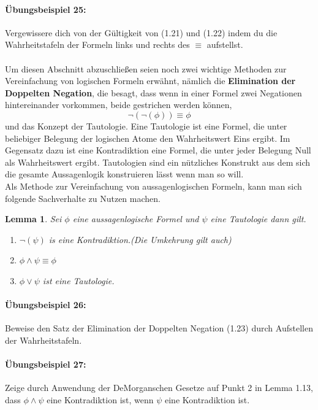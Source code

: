 \documentclass[11pt,a4paper,leqno]{report}
\newtheorem{lemma}[theorem]{Lemma}
\numberwithin{equation}{chapter}
\begin{document}
\paragraph{\"Ubungsbeispiel 25:} Vergewissere dich von der G\"ultigkeit von (1.21) und (1.22) indem du die Wahrheitstafeln der Formeln links und rechts des $\equiv$ aufstellst.\\
\\
Um diesen Abschnitt abzuschlie\ss{}en seien noch zwei wichtige Methoden zur Vereinfachung von logischen Formeln erw\"ahnt, n\"amlich die \textbf{Elimination der Doppelten Negation}, die besagt, dass wenn in einer Formel zwei Negationen hintereinander vorkommen, beide gestrichen werden k\"onnen,
\begin{equation}
\neg(\neg(\phi))\equiv\phi
\end{equation}
und das Konzept der Tautologie. Eine Tautologie ist eine Formel, die unter beliebiger Belegung der logischen Atome den Wahrheitswert Eins ergibt. 
Im Gegensatz dazu ist eine Kontradiktion eine Formel, die unter jeder Belegung Null als Wahrheitswert ergibt. Tautologien sind ein n\"utzliches Konstrukt aus dem sich die gesamte Aussagenlogik konstruieren l\"asst wenn man so will.\\
Als Methode zur Vereinfachung von aussagenlogischen Formeln, kann man sich folgende Sachverhalte zu Nutzen machen.
\begin{lemma}
	Sei $\phi$ eine aussagenlogische Formel und $\psi$ eine Tautologie dann gilt.
	\begin{enumerate}
		\item $\neg(\psi)$ is eine Kontradiktion.(Die Umkehrung gilt auch)
		\item $\phi\wedge\psi\equiv\phi$
		\item $\phi\vee\psi$ ist eine Tautologie.
	\end{enumerate}
\end{lemma}

\paragraph{\"Ubungsbeispiel 26:} Beweise den Satz der Elimination der Doppelten Negation (1.23) durch Aufstellen der Wahrheitstafeln.
\paragraph{\"Ubungsbeispiel 27:} Zeige durch Anwendung der DeMorganschen Gesetze auf Punkt 2 in Lemma 1.13, dass $\phi\wedge\psi$ eine Kontradiktion ist, wenn $\psi$ eine Kontradiktion ist.
\end{document}
